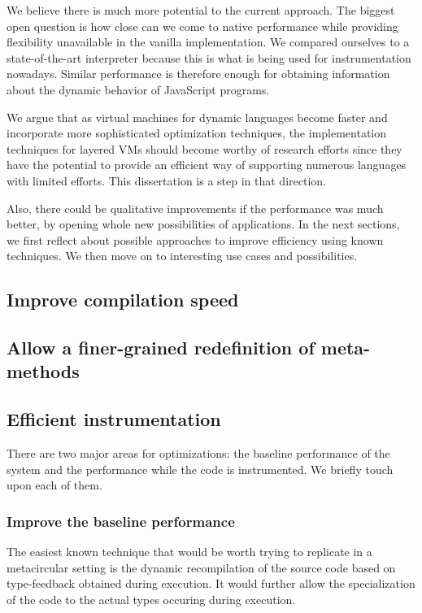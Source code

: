 We believe there is much more potential to the current approach. The
biggest open question is how close can we come to native performance while
providing flexibility unavailable in the vanilla implementation. We compared
ourselves to a state-of-the-art interpreter because this is what is being used
for instrumentation nowadays. Similar performance is therefore enough for
obtaining information about the dynamic behavior of JavaScript programs. 

We argue that as virtual machines for dynamic languages become faster and
incorporate more sophisticated optimization techniques, the implementation
techniques for layered VMs should become worthy of research efforts since they
have the potential to provide an efficient way of supporting numerous languages
with limited efforts. This dissertation is a step in that direction.



Also, there could be qualitative improvements if the performance was much
better, by opening whole new possibilities of applications.  In the next
sections, we first reflect about possible approaches to improve efficiency
using known techniques. We then move on to interesting use cases and
possibilities.

\subsection{Improve compilation speed}

\subsection{Allow a finer-grained redefinition of meta-methods}

\subsection{Efficient instrumentation}

There are two major areas for optimizations: the baseline performance of the
system and the performance while the code is instrumented. We briefly touch
upon each of them. 

\subsubsection{Improve the baseline performance}

The easiest known technique that would be worth trying to replicate in a
metacircular setting is the dynamic recompilation of the source code based on
type-feedback obtained during execution. It would further allow the
specialization of the code to the actual types occuring during execution.

